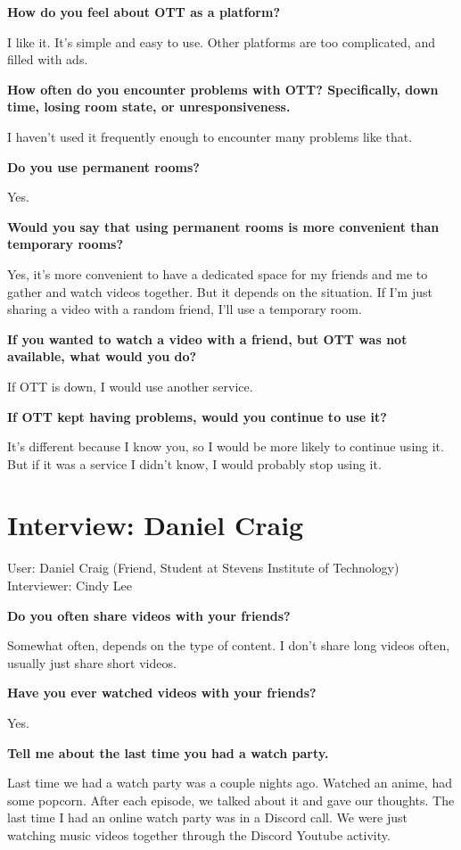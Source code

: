 \textbf{How do you feel about OTT as a platform?}

I like it. It's simple and easy to use. Other platforms are too complicated, and filled with ads.

\textbf{How often do you encounter problems with OTT? Specifically, down time, losing room state, or unresponsiveness.}

I haven't used it frequently enough to encounter many problems like that.

\textbf{Do you use permanent rooms?}

Yes.

\textbf{Would you say that using permanent rooms is more convenient than temporary rooms?}

Yes, it's more convenient to have a dedicated space for my friends and me to gather and watch videos together. But it depends on the situation. If I'm just sharing a video with a random friend, I'll use a temporary room.

\textbf{If you wanted to watch a video with a friend, but OTT was not available, what would you do?}

If OTT is down, I would use another service.

\textbf{If OTT kept having problems, would you continue to use it?}

It's different because I know you, so I would be more likely to continue using it. But if it was a service I didn't know, I would probably stop using it.

\section{Interview: Daniel Craig}

User: Daniel Craig (Friend, Student at Stevens Institute of Technology)\\
Interviewer: Cindy Lee

\textbf{Do you often share videos with your friends?}

Somewhat often, depends on the type of content. I don't share long videos often, usually just share short videos.

\textbf{Have you ever watched videos with your friends?}

Yes.

\textbf{Tell me about the last time you had a watch party.}

Last time we had a watch party was a couple nights ago. Watched an anime, had some popcorn. After each episode, we talked about it and gave our thoughts. The last time I had an online watch party was in a Discord call. We were just watching music videos together through the Discord Youtube activity.

